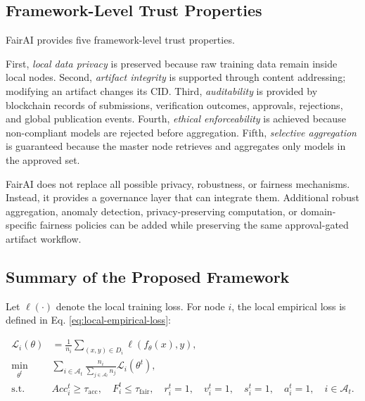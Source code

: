 \documentclass[futureinternet,article,submit,pdftex,moreauthors]{Definitions/mdpi}
\begin{document}
\subsection{Framework-Level Trust Properties}
\label{subsec:framework-trust-properties}

FairAI provides five framework-level trust properties.

First, \textit{local data privacy} is preserved because raw training data remain inside local nodes. Second, \textit{artifact integrity} is supported through content addressing; modifying an artifact changes its CID. Third, \textit{auditability} is provided by blockchain records of submissions, verification outcomes, approvals, rejections, and global publication events. Fourth, \textit{ethical enforceability} is achieved because non-compliant models are rejected before aggregation. Fifth, \textit{selective aggregation} is guaranteed because the master node retrieves and aggregates only models in the approved set.

FairAI does not replace all possible privacy, robustness, or fairness mechanisms. Instead, it provides a governance layer that can integrate them. Additional robust aggregation, anomaly detection, privacy-preserving computation, or domain-specific fairness policies can be added while preserving the same approval-gated artifact workflow.

\subsection{Summary of the Proposed Framework}
\label{subsec:framework-summary}

Let \(\ell(\cdot)\) denote the local training loss. For node \(i\), the local empirical loss is defined in Eq. \eqref{eq:local-empirical-loss}:

\begin{subequations}
	\label{eq:approved-subset-optimization}
	\begin{align}
		\mathcal{L}_i(\theta)
		&=
		\frac{1}{n_i}
		\sum_{(x,y)\in D_i}
		\ell(f_{\theta}(x),y),
		\label{eq:local-empirical-loss}
		\\
		\min_{\theta^t}
		\quad
		&
		\sum_{i \in \mathcal{A}_t}
		\frac{n_i}{\sum_{j \in \mathcal{A}_t} n_j}
		\mathcal{L}_i(\theta^t),
		\label{eq:approved-objective}
		\\
		\text{s.t.}
		\quad
		&
		Acc_i^t \geq \tau_{\mathrm{acc}},
		\quad
		F_i^t \leq \tau_{\mathrm{fair}},
		\quad
		r_i^t=1,
		\quad
		v_i^t=1,
		\quad
		s_i^t=1,
		\quad
		a_i^t=1,
		\quad
		i \in \mathcal{A}_t.
		\label{eq:approved-objective-constraints}
	\end{align}
\end{subequations}
\end{document}
